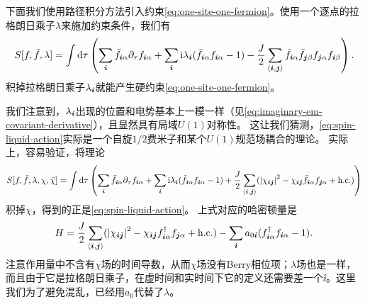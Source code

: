 下面我们使用路径积分方法引入约束\eqref{eq:one-site-one-fermion}。使用一个逐点的拉格朗日乘子$\lambda$来施加约束条件，我们有
\begin{equation}
    S[f, \bar{f}, \lambda] = \int \dd{\tau} \left( \sum_{\vb*{i}} \bar{f}_{\vb*{i} \alpha} \partial_\tau f_{\vb*{i} \alpha} + \sum_{\vb*{i}} \mathrm{i} \lambda_{\vb*{i}} (\bar{f}_{\vb*{i} \alpha} f_{\vb*{i} \alpha} - 1) - \frac{J}{2} \sum_{\langle \vb*{i}, \vb*{j} \rangle} \bar{f}_{\vb*{i} \alpha} \bar{f}_{\vb*{j} \beta} f_{\vb*{j} \alpha} f_{\vb*{i} \beta} \right).
    \label{eq:spin-liquid-action}
\end{equation}
积掉拉格朗日乘子$\lambda_{\vb*{i}}$就能产生硬约束\eqref{eq:one-site-one-fermion}。

我们注意到，$\lambda_{\vb*{i}}$出现的位置和电势基本上一模一样（见\eqref{eq:imaginary-em-covariant-derivative}），且显然具有局域$U(1)$对称性。
这让我们猜测，\eqref{eq:spin-liquid-action}实际是一个自旋$1/2$费米子和某个$U(1)$规范场耦合的理论。
实际上，容易验证，将理论
\begin{equation}
    S[f, \bar{f}, \lambda, \chi, \bar{\chi}] = \int \dd{\tau} \left( \sum_{\vb*{i}} \bar{f}_{\vb*{i} \alpha} \partial_\tau f_{\vb*{i} \alpha} + \sum_{\vb*{i}} \mathrm{i} \lambda_{\vb*{i}} (\bar{f}_{\vb*{i} \alpha} f_{\vb*{i} \alpha} - 1) + \frac{J}{2} \sum_{\langle \vb*{i}, \vb*{j} \rangle} (\abs{\chi_{\vb*{i} \vb*{j}}}^2 - \chi_{\vb*{i} \vb*{j}} \bar{f}_{\vb*{i} \alpha} f_{\vb*{j} \alpha} + \text{h.c.}) \right)
\end{equation}
积掉$\chi$，得到的正是\eqref{eq:spin-liquid-action}。
上式对应的哈密顿量是
\begin{equation}
    H = \frac{J}{2} \sum_{\langle \vb*{i}, \vb*{j} \rangle} (\abs{\chi_{\vb*{i} \vb*{j}}}^2 - \chi_{\vb*{i} \vb*{j}} {f}^\dagger_{\vb*{i} \alpha} f_{\vb*{j} \alpha} + \text{h.c.}) - \sum_{\vb*{i}} a_{0 \vb*{i}} (f^\dagger_{\vb*{i} \alpha} f_{\vb*{i} \alpha} - 1).
    \label{eq:simplest-heisenberg-u-1-hamiltonian}
\end{equation}
注意作用量中不含有$\chi$场的时间导数，从而$\chi$场没有Berry相位项；$\lambda$场也是一样，而且由于它是拉格朗日乘子，在虚时间和实时间下它的定义还需要差一个$\ii$。这里我们为了避免混乱，已经用$a_0$代替了$\lambda$。

